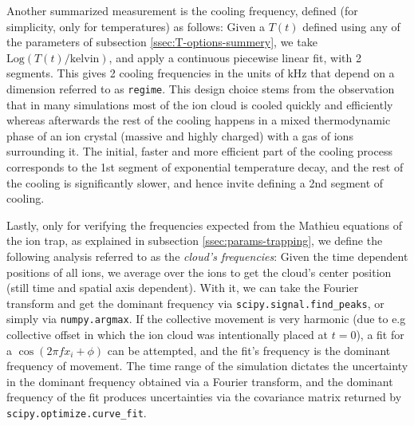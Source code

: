 Another summarized measurement is the cooling frequency, defined (for simplicity, only for temperatures) as follows: Given a $T(t)$ defined using any of the parameters of subsection \ref{ssec:T-options-summery}, we take $\mathrm{Log}(T(t)/\mathrm{kelvin})$, and apply a continuous piecewise linear fit\cite{pwlf}, with 2 segments. This gives 2 cooling frequencies in the units of $\mathrm{kHz}$ that depend on a dimension referred to as \texttt{regime}. This design choice stems from the observation that in many simulations most of the ion cloud is cooled quickly and efficiently whereas afterwards the rest of the cooling happens in a mixed thermodynamic phase of an ion crystal (massive and highly charged) with a gas of ions surrounding it. The initial, faster and more efficient part of the cooling process corresponds to the 1st segment of exponential temperature decay, and the rest of the cooling is significantly slower, and hence invite defining a 2nd segment of cooling.

Lastly, only for verifying the frequencies expected from the Mathieu equations of the ion trap, as explained in subsection \ref{ssec:params-trapping}, we define the following analysis referred to as the \textit{cloud's frequencies}: Given the time dependent positions of all ions, we average over the ions to get the cloud's center position (still time and spatial axis dependent). With it, we can take the Fourier transform and get the dominant frequency via \texttt{scipy.signal.find\_peaks}\cite{scipy}, or simply via \texttt{numpy.argmax}\cite{numpy}. If the collective movement is very harmonic (due to e.g collective offset in which the ion cloud was intentionally placed at $t=0$), a fit for a $\cos(2\pi f x_i + \phi)$ can be attempted, and the fit's frequency is the dominant frequency of movement. The time range of the simulation dictates the uncertainty in the dominant frequency obtained via a Fourier transform, and the dominant frequency of the fit produces uncertainties via the covariance matrix returned by \texttt{scipy.optimize.curve\_fit}.
